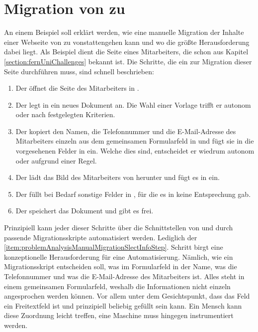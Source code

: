 \section{Migration von {\wordpress} zu {\imperia}}
    An einem Beispiel soll erklärt werden,
    wie eine manuelle Migration der Inhalte einer Webseite von {\wordpress} zu {\imperia}
    vonstattengehen kann und wo die größte Herausforderung dabei liegt.
    Als Beispiel dient die Seite eines Mitarbeiters,
    die schon aus Kapitel \ref{section:fernUniChallenges} bekannt ist.
    Die Schritte, die ein {\editor} zur Migration dieser Seite durchführen muss,
    sind schnell beschrieben:

    \begin{enumerate}
        \item   Der {\editor} öffnet die Seite des Mitarbeiters in {\wordpress}.
        \item   Der {\editor} legt in {\imperia} ein neues Dokument an.
                Die Wahl einer Vorlage trifft er autonom oder nach festgelegten Kriterien.
        \item   \label{item:problemAnalysisManualMigrationSlectInfoStep}Der {\editor} kopiert den Namen, die Telefonnummer und die E-Mail-Adresse
                des Mitarbeiters einzeln aus dem gemeinsamen Formularfeld in {\wordpress}
                und fügt sie in die vorgesehenen Felder in {\imperia} ein.
                Welche dies sind, entscheidet er wiedrum autonom oder aufgrund einer Regel.
        \item   Der {\editor} lädt das Bild des Mitarbeiters von {\wordpress} herunter
                und fügt es in {\imperia} ein.
        \item   Der {\editor} füllt bei Bedarf sonstige Felder in {\imperia},
                für die es in {\wordpress} keine Entsprechung gab.
        \item   Der {\editor} speichert das Dokument und gibt es frei.
    \end{enumerate}

    Prinzipiell kann jeder dieser Schritte über die Schnittstellen von {\wordpress}
    und {\imperia} durch passende Migrationsskripte automatisiert werden.
    Lediglich der \ref{item:problemAnalysisManualMigrationSlectInfoStep}. Schritt
    birgt eine konzeptionelle Herausforderung für eine Automatisierung.
    Nämlich, wie ein Migrationsskript entscheiden soll, was im Formularfeld in {\wordpress}
    der Name, was die Telefonnummer und was die E-Mail-Adresse des Mitarbeiters ist.
    Alles steht in einem gemeinsamen Formularfeld, weshalb die Informationen nicht
    einzeln angesprochen werden können.
    Vor allem unter dem Gesichtspunkt, dass das Feld ein Freitextfeld ist und prinzipiell beliebig gefüllt sein kann.
    Ein Mensch kann diese Zuordnung leicht treffen,
    eine Maschine muss hingegen instrumentiert werden.
